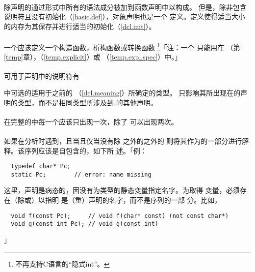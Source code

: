 \paragraph{}
除声明的通过形式中所有的语法成分被加到函数声明中以构成。
但是，除非包含说明符且没有初始化（\ref{basic.def}），对象声明也是一个
定义。定义使得适当大小的内存为其保存并进行适当的初始化（\ref{dcl.init}）。

\paragraph{}
一个应该定义一个构造函数，析构函数或转换函数
\footnote{不再支持C语言的``隐式int''。}「注：一个
只能用在
（第\ref{temp}章），（\ref{temp.explicit}）或
（\ref{temp.expl.spec}）中。」

\paragraph{}
可用于声明中的说明符有


中可选的适用于之前的
（\ref{dcl.meaning}）所确定的类型。
只影响其所出现在的声明的类型，而不是相同类型所涉及到
的其他声明。

\paragraph{}
在完整的中每一个应该只出现一次，除了
可以出现两次。

\paragraph{}
如果在分析时遇到，且当且仅当没有除
之外的之外的
则将其作为的一部分进行解释。该序列应该是自包含的，如下所
述。「例：
\begin{lstlisting}
  typedef char* Pc;
  static Pc;        // error: name missing
\end{lstlisting}
这里，声明是病态的，因没有为类型的静态变量指定名字。为取得
变量，必须存在（除或）以指明
 是（重）声明的名字，而不是序列的一部
分。比如，
\begin{lstlisting}
  void f(const Pc);     // void f(char* const) (not const char*)
  void g(const int Pc); // void g(const int)
\end{lstlisting}」

